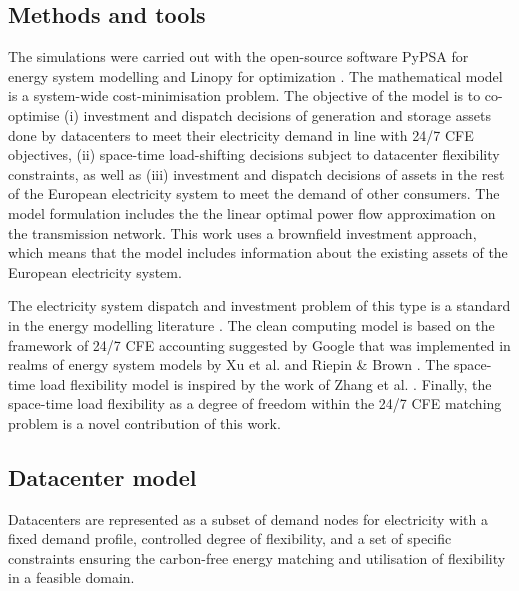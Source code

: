%

\subsection{Methods and tools}

The simulations were carried out with the open-source software PyPSA for energy system modelling \cite{horschPyPSAEurOpenOptimisation2018} and Linopy for optimization \cite{LinopyLinearOptimization2024}.
The mathematical model is a system-wide cost-minimisation problem.
The objective of the model is to co-optimise (i) investment and dispatch decisions of generation and storage assets done by datacenters to meet their electricity demand in line with 24/7 CFE objectives, (ii) space-time load-shifting decisions subject to datacenter flexibility constraints, as well as (iii) investment and dispatch decisions of assets in the rest of the European electricity system to meet the demand of other consumers.
The model formulation includes the the linear optimal power flow approximation on the transmission network.
This work uses a brownfield investment approach, which means that the model includes information about the existing assets of the European electricity system.

The electricity system dispatch and investment problem of this type is a standard in the energy modelling literature \cite{OpenModelsWikib}. The clean computing model is based on the framework of 24/7 CFE accounting suggested by Google \cite{google-methodologies} that was implemented in realms of energy system models by Xu et al. \cite{xu-247CFE-report} and Riepin \& Brown \cite{riepinMeansCostsSystemlevel2023}. The space-time load flexibility model is inspired by the work of Zhang et al. \cite{zhangRemuneratingSpaceTime2022}. Finally, the space-time load flexibility as a degree of freedom within the 24/7 CFE matching problem is a novel contribution of this work.


\subsection{Datacenter model}

Datacenters are represented as a subset of demand nodes for electricity with a fixed demand profile, controlled degree of flexibility, and a set of specific constraints ensuring the carbon-free energy matching and utilisation of flexibility in a feasible domain.

